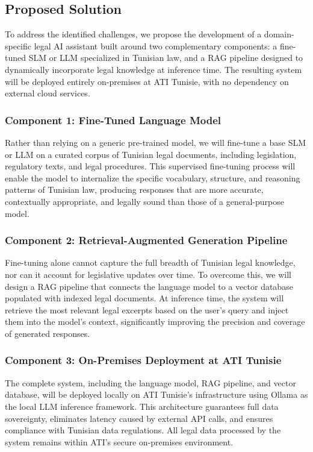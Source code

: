 \subsection{Proposed Solution}

To address the identified challenges, we propose the development of a domain-specific 
legal \ac{AI} assistant built around two complementary components: a fine-tuned 
\ac{SLM} or \ac{LLM} specialized in Tunisian law, and a \ac{RAG} pipeline designed 
to dynamically incorporate legal knowledge at inference time. The resulting system 
will be deployed entirely on-premises at \ac{ATI} Tunisie, with no dependency on 
external cloud services.

\subsubsection*{Component 1: Fine-Tuned Language Model}

Rather than relying on a generic pre-trained model, we will fine-tune a base 
\ac{SLM} or \ac{LLM} on a curated corpus of Tunisian legal documents, including 
legislation, regulatory texts, and legal procedures. This supervised fine-tuning 
process will enable the model to internalize the specific vocabulary, structure, 
and reasoning patterns of Tunisian law, producing responses that are more accurate, 
contextually appropriate, and legally sound than those of a general-purpose model.

\subsubsection*{Component 2: Retrieval-Augmented Generation Pipeline}

Fine-tuning alone cannot capture the full breadth of Tunisian legal knowledge, nor 
can it account for legislative updates over time. To overcome this, we will design 
a \ac{RAG} pipeline that connects the language model to a vector database populated 
with indexed legal documents. At inference time, the system will retrieve the most 
relevant legal excerpts based on the user's query and inject them into the model's 
context, significantly improving the precision and coverage of generated responses.

\subsubsection*{Component 3: On-Premises Deployment at ATI Tunisie}

The complete system, including the language model, \ac{RAG} pipeline, and vector database, will
be deployed locally on \ac{ATI} Tunisie's infrastructure using Ollama as the local 
\ac{LLM} inference framework. This architecture guarantees full data sovereignty, 
eliminates latency caused by external \ac{API} calls, and ensures compliance with 
Tunisian data regulations. All legal data processed by the system remains within 
ATI's secure on-premises environment.

